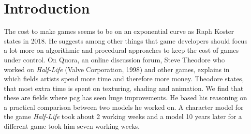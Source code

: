 \documentclass[10pt,a4paper]{article}
\begin{document}
\section{Introduction}\label{sec:Introduction}
\begin{multicols}{2}
The cost to make games seems to be on an exponential curve as Raph Koster states in 2018. He suggests among other things that game developers should focus a lot more on algorithmic and procedural approaches to keep the cost of games under control\cite{Koster2018}. On Quora, an online discussion forum, Steve Theodore who worked on \textit{Half-Life} (Valve Corporation, 1998) and other games, explains in which fields artists spend more time and therefore more money. Theodore states, that most extra time is spent on texturing, shading and animation. We find that these are fields where \gls{pcg} has seen huge improvements. He based his reasoning on a practical comparison between two models he worked on. A character model for the game \textit{Half-Life} took about 2 working weeks and a model 10 years later for a different game took him seven working weeks\cite{Prinke2017}.


\end{multicols}
\end{document}
